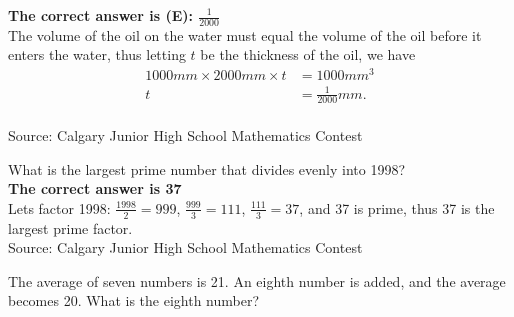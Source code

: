 \documentclass{article}
\begin{document}

\textbf{The correct answer is (E): $\frac{1}{2000}$}\\[1 ex]
The volume of the oil on the water must equal the volume of the oil before it enters the water, thus letting $t$ be the thickness of the oil, we have
\begin{align*}
1000mm\times2000mm\times t&=1000mm^3\\
t&=\frac{1}{2000}mm.
\end{align*}
\\[5 ex]

\scriptsize
Source: Calgary Junior High School Mathematics Contest

\normalsize
What is the largest prime number that divides evenly into 1998?\\


\textbf{The correct answer is 37}\\[1 ex]
Lets factor 1998: $\frac{1998}{2}=999$, $\frac{999}{3}=111$, $\frac{111}{3}=37$, and 37 is prime, thus 37 is the largest prime factor.
\\[5 ex]

\scriptsize
Source: Calgary Junior High School Mathematics Contest

\normalsize
The average of seven numbers is 21. An eighth number is added, and the average becomes 20. What is the eighth number?\\
\end{document}
